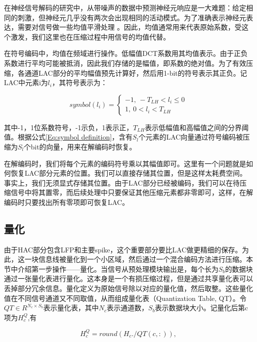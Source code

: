 在神经信号解码的研究中，从带噪声的数据中预测神经元响应是一大难题：给定相同的刺激，但神经元几乎没有两次会出现相同的活动模式。为了准确表示神经元表达，需要对信号做一些均值平滑处理 \cite{31}。因此，均值通常用来代表原始系数，受这个激发，我们这里也在压缩过程中用信号的均值代替。

在符号编码中，均值在频域进行操作。低幅值DCT系数用其均值表示。由于正负系数进行平均可能被抵消，因此我们存储的是幅值，即系数的绝对值。为了有效压缩，各通道LAC部分的平均幅值预先计算好，然后用1-bit的符号表示其正负。记LAC中元素i为$l_i$，其符号表示为：

\begin{equation}\label{Eq:symbol definition}
  symbol(l_i)=\left\{
    \begin{array}{lr}
        -1,\ -T_{LH}<l_i\leq 0\\
        1,\ 0<l_i<T_{LH}
    \end{array}
  \right.
\end{equation}

其中-1，1位系数符号，-1示负，1表示正，$T_{LH}$表示低幅值和高幅值之间的分界阈值。根据公式\ref{Eq:symbol definition}，含有$S_l$个元素的LAC向量通过符号编码被压缩为$S_l$个bit的向量，用来在解编码时恢复。

在解编码时，我们将每个元素的编码符号乘以其幅值即可。这里有一个问题就是如何恢复LAC部分元素的位置。我们可以直接存储其位置，但是这样太耗费空间。事实上，我们无须显式存储其位置。由于LAC部分已经被编码，我们可以在待压缩信号中将其置零，而后续处理中只要保证其他压缩元素都非零即可，这样，在解编码时只要找出所有零项即可恢复LAC。



\subsection{量化}
由于HAC部分包含LFP和主要spike，这个重要部分要比LAC做更精细的保存。为此，这一块信息线被量化到一个小区域，然后通过一个混合编码方法进行压缩。本节中介绍第一步操作——量化。当信号从预处理模块输出是，每个长为$S_b$的数据块通过一张量化表进行量化。这本身是一个有损压缩过程，但是通过共享量化表可以丢掉部分冗余信息。量化定义为原始信号除以对应的量化值，然后取整。这些量化值在不同信号通道又不同取值，从而组成量化表（Quantization Table, QT）。令$QT\in R^{N_c\times S_b}$表示量化表，其中$N_c$表示通道数，$S_b$表示数据块大小。记量化后第c项为$H_c^Q$,有

\begin{equation}\label{Eq:Quantization Step}
  H_c^Q=round(H_c./QT(c,:)),
\end{equation}

